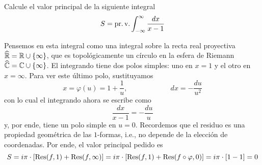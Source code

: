 \begin{exercise}
Calcule el valor principal de la siguiente integral
$$S = \operatorname{pr.v.} \int_{-\infty}^\infty \frac {dx} {x-1}$$
\end{exercise}

\begin{solution}
Pensemos en esta integral como una integral sobre la recta real proyectiva $\widehat {\mathbb R} = \mathbb R \cup \{ \infty \}$, que es topológicamente un círculo en la esfera de Riemann $\widehat {\mathbb C} = \mathbb C \cup \{ \infty \}$. El integrando tiene dos polos simples: uno en $x = 1$ y el otro en $x = \infty$. Para ver este último polo, sustituyamos
$$x = \varphi(u) = 1 + \frac 1u, \qquad \qquad \qquad dx = -\frac {du} {u^2}$$
con lo cual el integrando ahora se escribe como
$$\frac {dx} {x - 1} = -\frac {du} u$$
y, por ende, tiene un polo simple en $u = 0$. Recordemos que el residuo es una propiedad geométrica de las $1$-formas, i.e., no depende de la elección de coordenadas. Por ende, el valor principal pedido es
$$
S
    = i\pi \cdot [\operatorname{Res}(f, 1) + \operatorname{Res}(f, \infty)]
    = i\pi \cdot [\operatorname{Res}(f, 1) + \operatorname{Res}(f \circ \varphi, 0)]
    = i\pi \cdot [1 - 1]
    = 0
$$
\end{solution}
